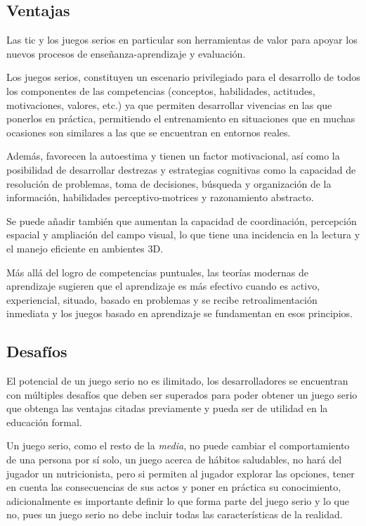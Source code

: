 \subsection{Ventajas}

Las \Gls{tic} y los juegos serios en particular son herramientas de
 valor para apoyar los nuevos procesos de
enseñanza-aprendizaje y evaluación\cite{guenaga2013serious}.

Los juegos serios, constituyen un escenario privilegiado para el desarrollo de
todos los componentes de las competencias (conceptos, habilidades, actitudes,
motivaciones, valores, etc.) ya que permiten desarrollar vivencias en las que
ponerlos en práctica, permitiendo el entrenamiento en situaciones que en muchas
ocasiones son similares a las que se encuentran en entornos
reales\cite{guenaga2013serious}.

Además, favorecen la autoestima y tienen un factor motivacional, así como la
posibilidad de desarrollar destrezas y estrategias cognitivas como la capacidad
de resolución de problemas, toma de decisiones, búsqueda y organización de la
información, habilidades perceptivo-motrices y razonamiento
abstracto\cite{guenaga2013serious}.

Se puede añadir también que aumentan la capacidad de coordinación, percepción
espacial y ampliación del campo visual, lo que tiene una incidencia en la
lectura y el manejo eficiente en ambientes 3D\cite{guenaga2013serious}. 

Más allá del logro de competencias puntuales, las teorías modernas de
aprendizaje sugieren que el aprendizaje es más efectivo cuando es activo,
experiencial, situado, basado en problemas y se recibe retroalimentación
inmediata y los juegos basado en aprendizaje se fundamentan en esos
principios\cite{guenaga2013serious}.



\subsection{Desafíos}


El potencial de un juego serio no es ilimitado, los desarrolladores se
encuentran con múltiples desafíos que deben ser superados para poder obtener un
juego serio que obtenga las ventajas citadas previamente y pueda ser de utilidad
en la educación formal.

Un juego serio, como el resto de la \textit{media}, no puede cambiar el
comportamiento de una persona por sí solo, un juego acerca de hábitos
saludables, no hará del jugador un nutricionista, pero si permiten al jugador
explorar las opciones, tener en cuenta las consecuencias de sus actos y poner en
práctica su conocimiento\cite{education:games}, adicionalmente es importante
definir lo que forma parte del juego serio y lo que no, pues un juego serio no
debe incluir todas las características de la
realidad\cite{stapleton2004serious,videojuegos:gonzaleztardon}. 

